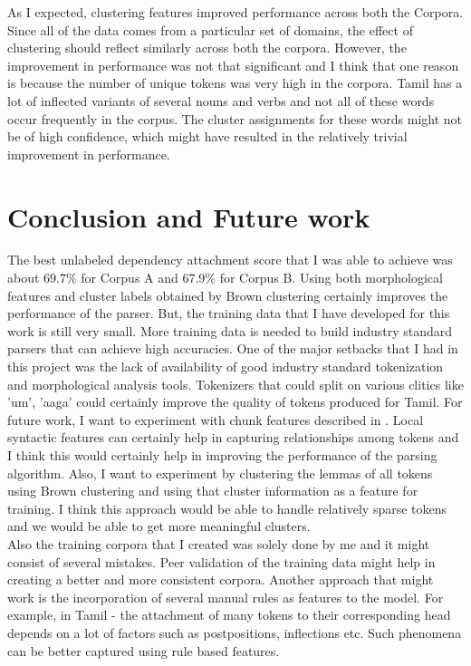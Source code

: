 \documentclass[11pt,letterpaper]{article}
\begin{document}
As I expected, clustering features improved performance across both the Corpora. Since all of the data comes from a particular set of domains, the effect of
clustering should reflect similarly across both the corpora. However, the improvement in performance was not that significant and I think that one reason
is because the number of unique tokens was very high in the corpora. Tamil has a lot of inflected variants of several nouns and verbs and not all 
of these words occur frequently in the corpus. The cluster assignments for these words might not be of high confidence, which might have resulted in the relatively
trivial improvement in performance.

\section{Conclusion and Future work}

The best unlabeled dependency attachment score that I was able to achieve was about 69.7\% for Corpus A and 67.9\% for Corpus B. Using both morphological
features and cluster labels obtained by Brown clustering certainly improves the performance of the parser. But, the training data that I have developed for this work
is still very small. More training data is needed to build industry standard parsers that can achieve high accuracies. One of the major setbacks that I had in this 
project was the lack of availability of good industry standard tokenization and morphological analysis tools. Tokenizers that could split on various clitics like 'um', 'aaga'
could certainly improve the quality of tokens produced for Tamil. For future work, I want to experiment with chunk features described in \cite{ambati2010two}. Local syntactic features
can certainly help in capturing relationships among tokens and I think this would certainly help in improving the performance of the parsing algorithm.
Also, I want to experiment by clustering the lemmas of all tokens using Brown clustering and using that cluster information as a feature for training.
I think this approach would be able to handle relatively sparse tokens and we would be able to get more meaningful clusters. \\

Also the training corpora that I created was solely done by me and it might consist of several mistakes. Peer validation of the training data might 
help in creating a better and more consistent corpora. Another approach that might work is the incorporation of several manual rules as features to
the model. For example, in Tamil - the attachment of many tokens to their corresponding head depends on a lot of factors such as postpositions, inflections etc. Such phenomena
can be better captured using rule based features.




\label{lastpage}
\end{document}
